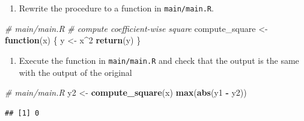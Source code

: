 \documentclass[]{book}
\newenvironment{Shaded}{\begin{snugshade}}{\end{snugshade}}
\newcommand{\KeywordTok}[1]{\textcolor[rgb]{0.13,0.29,0.53}{\textbf{#1}}}
\newcommand{\DecValTok}[1]{\textcolor[rgb]{0.00,0.00,0.81}{#1}}
\newcommand{\StringTok}[1]{\textcolor[rgb]{0.31,0.60,0.02}{#1}}
\newcommand{\CommentTok}[1]{\textcolor[rgb]{0.56,0.35,0.01}{\textit{#1}}}
\newcommand{\ControlFlowTok}[1]{\textcolor[rgb]{0.13,0.29,0.53}{\textbf{#1}}}
\newcommand{\OperatorTok}[1]{\textcolor[rgb]{0.81,0.36,0.00}{\textbf{#1}}}
\newcommand{\NormalTok}[1]{#1}
\providecommand{\tightlist}{%
  \setlength{\itemsep}{0pt}\setlength{\parskip}{0pt}}
\begin{document}
\begin{enumerate}
\def\labelenumi{\arabic{enumi}.}
\setcounter{enumi}{1}
\tightlist
\item
  Rewrite the procedure to a function in \texttt{main/main.R}.
\end{enumerate}

\begin{Shaded}
\begin{Highlighting}[]
\CommentTok{# main/main.R}
\CommentTok{# compute coefficient-wise square}
\NormalTok{compute_square <-}
\StringTok{  }\ControlFlowTok{function}\NormalTok{(x) \{}
\NormalTok{    y <-}\StringTok{ }\NormalTok{x}\OperatorTok{^}\DecValTok{2}
    \KeywordTok{return}\NormalTok{(y)}
\NormalTok{  \}}
\end{Highlighting}
\end{Shaded}

\begin{enumerate}
\def\labelenumi{\arabic{enumi}.}
\setcounter{enumi}{2}
\tightlist
\item
  Execute the function in \texttt{main/main.R} and check that the output
  is the same with the output of the original
\end{enumerate}

\begin{Shaded}
\begin{Highlighting}[]
\CommentTok{# main/main.R}
\NormalTok{y2 <-}\StringTok{ }\KeywordTok{compute_square}\NormalTok{(x)}
\KeywordTok{max}\NormalTok{(}\KeywordTok{abs}\NormalTok{(y1 }\OperatorTok{-}\StringTok{ }\NormalTok{y2))}
\end{Highlighting}
\end{Shaded}

\begin{verbatim}
## [1] 0
\end{verbatim}
\end{document}
